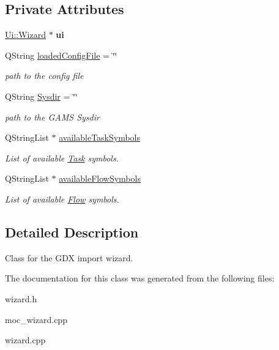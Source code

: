 \subsection*{Private Attributes}
\begin{DoxyCompactItemize}
\item 
\hypertarget{class_wizard_ad24ade19011c55a41d046fcb77e08e2c}{}\hyperlink{class_ui_1_1_wizard}{Ui\+::\+Wizard} $\ast$ {\bfseries ui}\label{class_wizard_ad24ade19011c55a41d046fcb77e08e2c}

\item 
\hypertarget{class_wizard_a91d00c36482a510a5c84c555b318acbf}{}Q\+String \hyperlink{class_wizard_a91d00c36482a510a5c84c555b318acbf}{loaded\+Config\+File} = \char`\"{}\char`\"{}\label{class_wizard_a91d00c36482a510a5c84c555b318acbf}

\begin{DoxyCompactList}\small\item\em path to the config file \end{DoxyCompactList}\item 
\hypertarget{class_wizard_afb7142f7df6156f74c2e0bb38f48a56a}{}Q\+String \hyperlink{class_wizard_afb7142f7df6156f74c2e0bb38f48a56a}{Sysdir} = \char`\"{}\char`\"{}\label{class_wizard_afb7142f7df6156f74c2e0bb38f48a56a}

\begin{DoxyCompactList}\small\item\em path to the G\+A\+M\+S Sysdir \end{DoxyCompactList}\item 
\hypertarget{class_wizard_a5f8ca2a02c9d656cf4a0f81949c692aa}{}Q\+String\+List $\ast$ \hyperlink{class_wizard_a5f8ca2a02c9d656cf4a0f81949c692aa}{available\+Task\+Symbols}\label{class_wizard_a5f8ca2a02c9d656cf4a0f81949c692aa}

\begin{DoxyCompactList}\small\item\em List of available \hyperlink{struct_task}{Task} symbols. \end{DoxyCompactList}\item 
\hypertarget{class_wizard_af441710077161dca35e55e3498caeb7b}{}Q\+String\+List $\ast$ \hyperlink{class_wizard_af441710077161dca35e55e3498caeb7b}{available\+Flow\+Symbols}\label{class_wizard_af441710077161dca35e55e3498caeb7b}

\begin{DoxyCompactList}\small\item\em List of available \hyperlink{struct_flow}{Flow} symbols. \end{DoxyCompactList}\end{DoxyCompactItemize}


\subsection{Detailed Description}
Class for the G\+D\+X import wizard. 

The documentation for this class was generated from the following files\+:\begin{DoxyCompactItemize}
\item 
wizard.\+h\item 
moc\+\_\+wizard.\+cpp\item 
wizard.\+cpp\end{DoxyCompactItemize}
